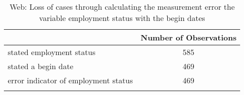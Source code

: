 \begin{table}[h]
	\centering
	\caption{Web: Loss of cases through calculating the measurement error the variable employment status with the begin dates}\label{tab:loss of cases cati2}
	\begin{tabularx}{\textwidth}{Xc}
		\addlinespace \addlinespace
		                               		 & Number of Observations \\ 
		\midrule
		\addlinespace
		 stated employment status       		&585   \\ \addlinespace
		 stated a begin date           		 	&469   \\ \addlinespace
		 error indicator of employment status 	&469    \\ \addlinespace 
		\bottomrule    
	\end{tabularx}
	
\end{table}